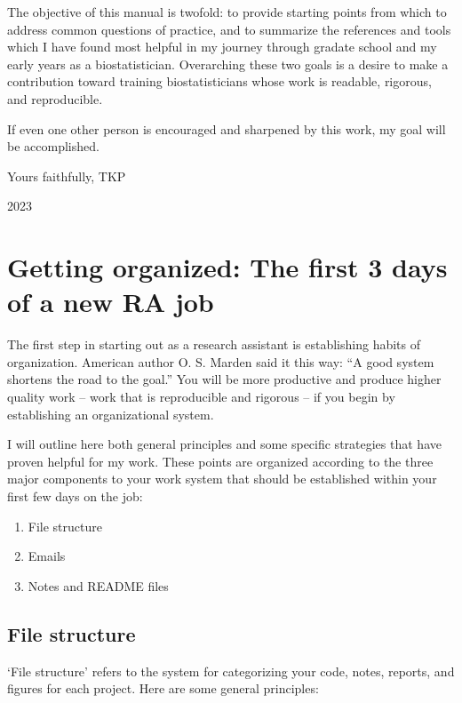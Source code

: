 \documentclass[
]{book}
\begin{document}
The objective of this manual is twofold: to provide starting points from which to address common questions of practice, and to summarize the references and tools which I have found most helpful in my journey through gradate school and my early years as a biostatistician. Overarching these two goals is a desire to make a contribution toward training biostatisticians whose work is readable, rigorous, and reproducible.

If even one other person is encouraged and sharpened by this work, my goal will be accomplished.

Yours faithfully,
TKP

2023

\hypertarget{getting-organized-the-first-3-days-of-a-new-ra-job}{%
\chapter{Getting organized: The first 3 days of a new RA job}\label{getting-organized-the-first-3-days-of-a-new-ra-job}}

The first step in starting out as a research assistant is establishing habits of organization. American author O. S. Marden said it this way: ``A good system shortens the road to the goal.'' You will be more productive and produce higher quality work -- work that is reproducible and rigorous -- if you begin by establishing an organizational system.

I will outline here both general principles and some specific strategies that have proven helpful for my work. These points are organized according to the three major components to your work system that should be established within your first few days on the job:

\begin{enumerate}
\def\labelenumi{\arabic{enumi}.}
\item
  File structure
\item
  Emails
\item
  Notes and README files
\end{enumerate}

\hypertarget{file-structure}{%
\section{File structure}\label{file-structure}}

`File structure' refers to the system for categorizing your code, notes, reports, and figures for each project. Here are some general principles:
\end{document}

